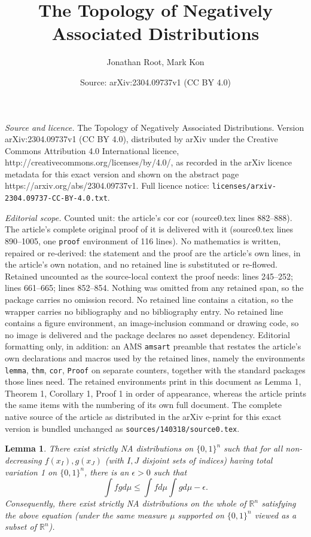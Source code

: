 \documentclass[10pt,a4paper]{amsart}
\title{The Topology of Negatively Associated Distributions}
\author{Jonathan Root, Mark Kon}
\date{Source: arXiv:2304.09737v1 (CC BY 4.0)}
\newtheorem{lemma}{Lemma}
\newcommand{\R}{\mathbb{R}}
\begin{document}
\maketitle

\noindent\emph{Source and licence.} The Topology of Negatively Associated Distributions. Version arXiv:2304.09737v1 (CC BY 4.0), distributed by arXiv under the Creative Commons Attribution 4.0 International licence, http://creativecommons.org/licenses/by/4.0/, as recorded in the arXiv licence metadata for this exact version and shown on the abstract page https://arxiv.org/abs/2304.09737v1. Full licence notice: \texttt{licenses/arxiv-2304.09737-CC-BY-4.0.txt}.\par\smallskip

\noindent\textit{Editorial scope.} Counted unit: the article's cor cor (source0.tex lines 882--888). The article's complete original proof of it is delivered with it (source0.tex lines 890--1005, one \texttt{proof} environment of 116 lines). No mathematics is written, repaired or re-derived: the statement and the proof are the article's own lines, in the article's own notation, and no retained line is substituted or re-flowed.  Retained uncounted as the source-local context the proof needs: lines 245--252; lines 661--665; lines 852--854.  Nothing was omitted from any retained span, so the package carries no omission record.  No retained line contains a citation, so the wrapper carries no bibliography and no bibliography entry.  No retained line contains a figure environment, an image-inclusion command or drawing code, so no image is delivered and the package declares no asset dependency.  Editorial formatting only, in addition: an AMS \texttt{amsart} preamble that restates the article's own declarations and macros used by the retained lines, namely the environments \texttt{lemma}, \texttt{thm}, \texttt{cor}, \texttt{Proof} on separate counters, together with the standard packages those lines need.  The retained environments print in this document as Lemma 1, Theorem 1, Corollary 1, Proof 1 in order of appearance, whereas the article prints the same items with the numbering of its own full document.  The complete native source of the article as distributed in the arXiv e-print for this exact version is bundled unchanged as \texttt{sources/140318/source0.tex}.
\begin{lemma}\label{strictNAexist}
There exist strictly NA distributions on $\{0,1\}^n$
such that for all non-decreasing $f(x_I),g(x_J)$ (with $I,J$ disjoint sets of indices) having total variation 1 on $\{0,1\}^n$, there is an $\epsilon>0$ such that
\[
\int fg d\mu \leq \int f d\mu \int g d\mu  -\epsilon .
\]
Consequently, there exist strictly NA distributions on the whole of $\R^n$ satisfying the above equation (under the same measure $\mu$ supported on $\{0,1\}^n$ viewed as a subset of $\R^n$).
\end{lemma}
\end{document}
